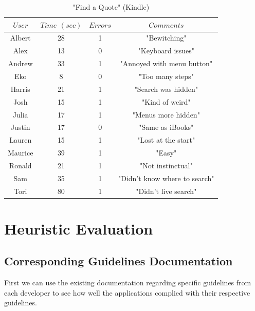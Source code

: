 \documentclass[journal, a4paper]{IEEEtran}
\begin{document}
    \begin{table}[!hbt]
		\begin{center}
		\caption{"Find a Quote" (Kindle)}
		\label{tab:task3learnKindle}
		\begin{tabular}{|c|c|c|c|}
			\hline
			$User$ & $Time$ $(sec)$ & $Errors$ & $Comments$\\
			\hline
            Albert & 28 & 1 & "Bewitching"\\
			\hline
			Alex & 13 & 0 & "Keyboard issues"\\
			\hline
            Andrew & 33 & 1 & "Annoyed with menu button"\\
			\hline
			Eko & 8 & 0 & "Too many steps"\\
			\hline
            Harris & 21 & 1 & "Search was hidden"\\
			\hline
			Josh & 15 & 1 & "Kind of weird"\\
			\hline
            Julia & 17 & 1 & "Menus more hidden"\\
			\hline
            Justin & 17 & 0 & "Same as iBooks"\\
			\hline
            Lauren & 15 & 1 & "Lost at the start"\\
			\hline
            Maurice & 39 & 1 & "Easy"\\
			\hline
            Ronald & 21 & 1 & "Not instinctual"\\
			\hline
            Sam & 35 & 1 & "Didn't know where to search"\\
			\hline
            Tori & 80 & 1 & "Didn't live search"\\
			\hline
		\end{tabular}
		\end{center}
	\end{table}
    

\section{Heuristic Evaluation}
\subsection{Corresponding Guidelines Documentation}
	First we can use the existing documentation regarding specific guidelines from each developer to see how well the applications complied with their respective guidelines.
\end{document}
